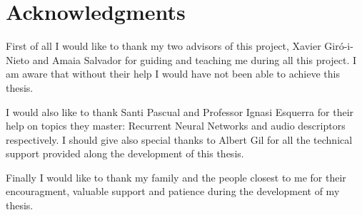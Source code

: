 \chapter*{Acknowledgments}

First of all I would like to thank my two advisors of this project, Xavier Giró-i-Nieto and Amaia Salvador for guiding and teaching me during all this project. I am aware that without their help I would have not been able to achieve this thesis.

I would also like to thank Santi Pascual and Professor Ignasi Esquerra for their help on topics they master: Recurrent Neural Networks and audio descriptors respectively. I should give also special thanks to Albert Gil for all the technical support provided along the development of this thesis.

Finally I would like to thank my family and the people closest to me for their encouragment, valuable support and patience during the development of my thesis.
